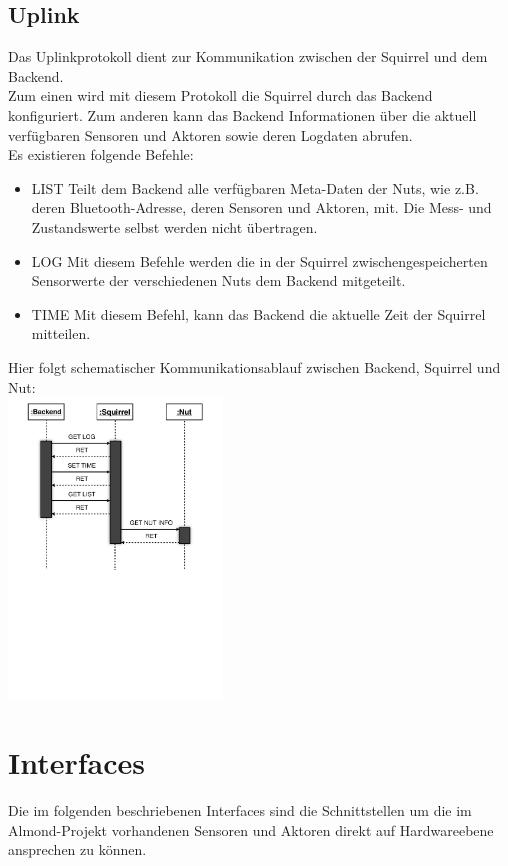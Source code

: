 \documentclass[12pt,a4paper]{article}
\begin{document}
	\subsection{Uplink}
Das Uplinkprotokoll dient zur Kommunikation zwischen der Squirrel und dem Backend.\\
Zum einen wird mit diesem Protokoll die Squirrel durch das Backend konfiguriert. Zum anderen kann das Backend Informationen über die aktuell verfügbaren Sensoren und Aktoren sowie deren Logdaten abrufen.\\
Es existieren folgende Befehle:
\begin{itemize}
	\item{LIST}
Teilt dem Backend alle verfügbaren Meta-Daten der Nuts, wie z.B. deren Bluetooth-Adresse, deren Sensoren und Aktoren, mit. Die Mess- und Zustandswerte selbst werden nicht übertragen.

	\item{LOG}
Mit diesem Befehle werden die in der Squirrel zwischengespeicherten Sensorwerte der verschiedenen Nuts dem Backend mitgeteilt.

	\item{TIME}
Mit diesem Befehl, kann das Backend die aktuelle Zeit der Squirrel mitteilen.

\end{itemize}
Hier folgt schematischer Kommunikationsablauf zwischen Backend, Squirrel und Nut:\\ 
\includegraphics[height=8cm]{./ProtokollSequence.pdf}\\

\section{Interfaces}
Die im folgenden beschriebenen Interfaces sind die Schnittstellen um die im Almond-Projekt vorhandenen Sensoren und Aktoren direkt auf Hardwareebene ansprechen zu können.
\end{document}
